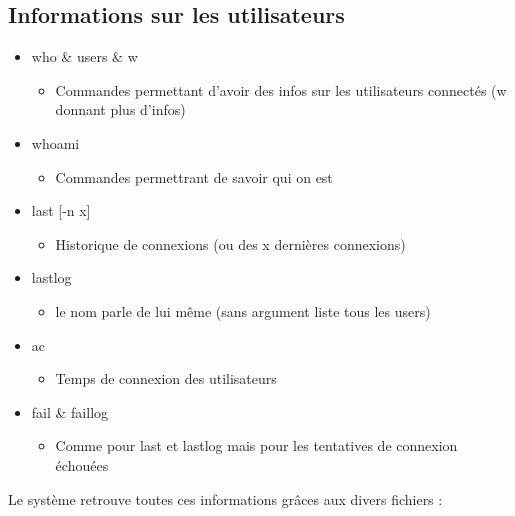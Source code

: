 \documentclass[a4paper]{article}
\begin{document}
    \subsection{Informations sur les utilisateurs}
    \begin{itemize}[label=\textbullet, font=\Large]
      \item who \& users \& w
      \begin{itemize}[label=, font=\scriptsize]
        \item Commandes permettant d'avoir des infos sur les utilisateurs connectés (w donnant plus d'infos)
      \end{itemize}
      \item whoami
      \begin{itemize}[label=, font=\scriptsize]
        \item Commandes permettrant de savoir qui on est
      \end{itemize}
      \item last [-n x]
      \begin{itemize}[label=, font=\scriptsize]
        \item Historique de connexions (ou des x dernières connexions)
      \end{itemize}
      \item lastlog
      \begin{itemize}[label=, font=\scriptsize]
        \item le nom parle de lui même (sans argument liste tous les users)
      \end{itemize}
      \item ac
      \begin{itemize}[label=, font=\scriptsize]
        \item Temps de connexion des utilisateurs
      \end{itemize}
      \item fail \& faillog
      \begin{itemize}[label=, font=\scriptsize]
        \item Comme pour last et lastlog mais pour les tentatives de connexion échouées
      \end{itemize}
    \end{itemize}
    Le système retrouve toutes ces informations grâces aux divers fichiers :
\end{document}
